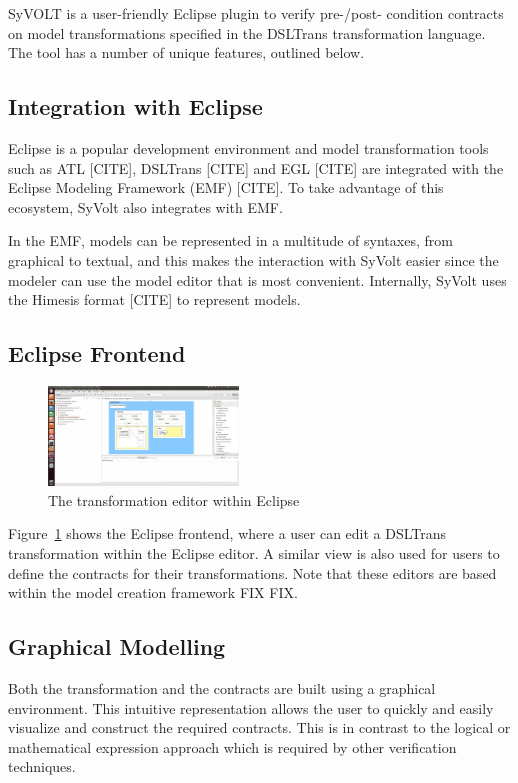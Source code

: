 SyVOLT is a user-friendly Eclipse plugin to verify pre-/post- condition
contracts on model transformations specified in the DSLTrans transformation
language. The tool has a number of unique features, outlined below.

\subsection{Integration with Eclipse}

Eclipse is a popular development environment and model transformation
tools such as ATL [CITE], DSLTrans [CITE] and EGL [CITE] are integrated with the
Eclipse Modeling Framework (EMF) [CITE].
To take advantage of this ecosystem, SyVolt also integrates with EMF.

In the EMF, models can be represented in a multitude of syntaxes, from graphical
to textual, and this makes the interaction with SyVolt easier since the modeler
can use the model editor that is most convenient. Internally, SyVolt uses 
the Himesis format [CITE] to represent models.

\subsection{Eclipse Frontend}

\begin{figure}
\centering
\includegraphics[width=0.45\textwidth]{figures/eclipse_frontend}
\caption{The transformation editor within Eclipse}
\label{fig:eclipse_frontend}
\end{figure}

Figure~\ref{fig:eclipse_frontend} shows the Eclipse frontend, where a user can
edit a DSLTrans transformation within the Eclipse editor. A similar view is also
used for users to define the contracts for their transformations. Note that
these editors are based within the model creation framework FIX FIX.

\subsection{Graphical Modelling}
Both the transformation and the contracts are built using a graphical
environment. This intuitive representation allows the user to quickly and easily
visualize and construct the required contracts. This is in contrast to  the
logical or mathematical expression approach which is required by other
verification techniques.

